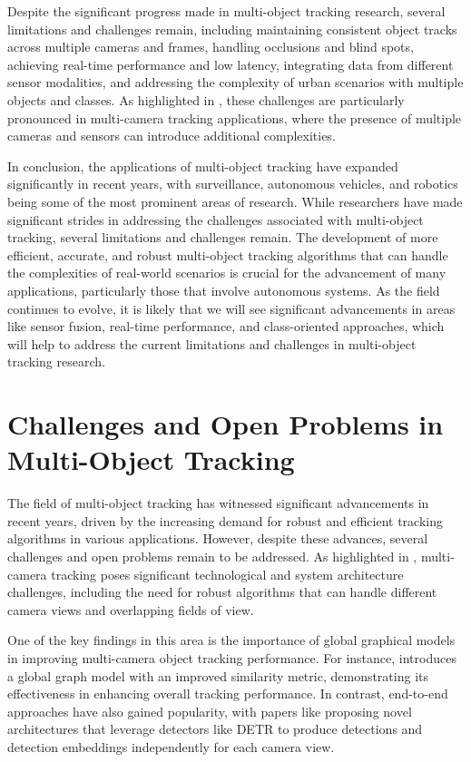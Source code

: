 \documentclass[conference]{IEEEtran}
\begin{document}
Despite the significant progress made in multi-object tracking research, several limitations and challenges remain, including maintaining consistent object tracks across multiple cameras and frames, handling occlusions and blind spots, achieving real-time performance and low latency, integrating data from different sensor modalities, and addressing the complexity of urban scenarios with multiple objects and classes. As highlighted in \cite{Challenge of Multi-Camera Tracking}, these challenges are particularly pronounced in multi-camera tracking applications, where the presence of multiple cameras and sensors can introduce additional complexities.

In conclusion, the applications of multi-object tracking have expanded significantly in recent years, with surveillance, autonomous vehicles, and robotics being some of the most prominent areas of research. While researchers have made significant strides in addressing the challenges associated with multi-object tracking, several limitations and challenges remain. The development of more efficient, accurate, and robust multi-object tracking algorithms that can handle the complexities of real-world scenarios is crucial for the advancement of many applications, particularly those that involve autonomous systems. As the field continues to evolve, it is likely that we will see significant advancements in areas like sensor fusion, real-time performance, and class-oriented approaches, which will help to address the current limitations and challenges in multi-object tracking research.

\section{Challenges and Open Problems in Multi-Object Tracking}
The field of multi-object tracking has witnessed significant advancements in recent years, driven by the increasing demand for robust and efficient tracking algorithms in various applications. However, despite these advances, several challenges and open problems remain to be addressed. As highlighted in \cite{Challenge of Multi-Camera Tracking}, multi-camera tracking poses significant technological and system architecture challenges, including the need for robust algorithms that can handle different camera views and overlapping fields of view.

One of the key findings in this area is the importance of global graphical models in improving multi-camera object tracking performance. For instance, \cite{An equalised global graphical model-based approach for multi-camera object tracking} introduces a global graph model with an improved similarity metric, demonstrating its effectiveness in enhancing overall tracking performance. In contrast, end-to-end approaches have also gained popularity, with papers like \cite{MCTR: Multi Camera Tracking Transformer} proposing novel architectures that leverage detectors like DETR to produce detections and detection embeddings independently for each camera view.
\end{document}
